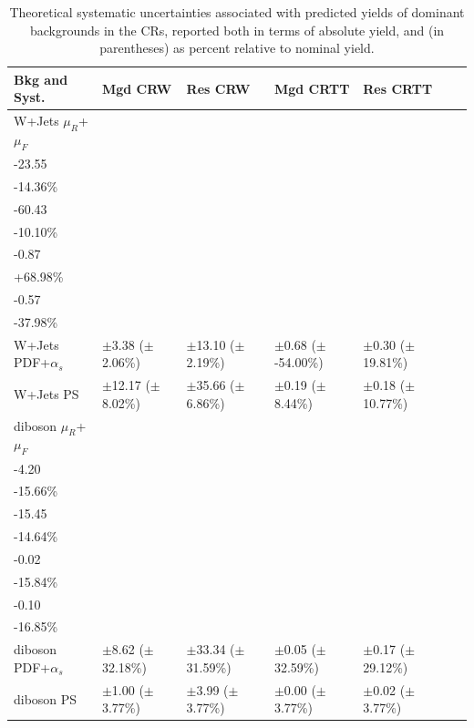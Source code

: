 \begin{table}[ht]
\footnotesize{
\caption[Theoretical systematic uncertainties associated with predicted yields of dominant backgrounds in the control regions.]{\label{tab:systs_bkg_CR} Theoretical systematic uncertainties associated with predicted yields of dominant backgrounds in the CRs, reported both in terms of absolute yield, and (in parentheses) as percent relative to nominal yield.}
\begin{tabular}{l l l l l l l }
\toprule
\textbf{Bkg and Syst.} & \textbf{Mgd CRW} & \textbf{Res CRW} & \textbf{Mgd CRTT} & \textbf{Res CRTT}\tabularnewline
\midrule
\midrule
W+Jets \(\mu_R\)+\(\mu_F\)  & \(\substack{+35.90\\-23.55}\) \big(\(\substack{+21.89\%\\-14.36\%}\)\big) & \(\substack{+42.02\\-60.43}\) \big(\(\substack{+7.03\%\\-10.10\%}\)\big) & \(\substack{+3.50\\-0.87}\) \big(\(\substack{-278.89\%\\+68.98\%}\)\big) & \(\substack{+4.83\\-0.57}\) \big(\(\substack{+319.96\%\\-37.98\%}\)\big) \tabularnewline
\midrule
W+Jets PDF+\(\alpha_s\) & \(\pm\)3.38 (\(\pm\)2.06\%) &\(\pm\)13.10 (\(\pm\)2.19\%) &\(\pm\)0.68 (\(\pm\)-54.00\%) &\(\pm\)0.30 (\(\pm\)19.81\%) \tabularnewline
\midrule
W+Jets PS & \(\pm\)12.17 (\(\pm\)8.02\%) &\(\pm\)35.66 (\(\pm\)6.86\%) &\(\pm\)0.19 (\(\pm\)8.44\%) &\(\pm\)0.18 (\(\pm\)10.77\%) \tabularnewline
\midrule
diboson \(\mu_R\)+\(\mu_F\) & \(\substack{+1.09\\-4.20}\) \big(\(\substack{+4.06\%\\-15.66\%}\)\big) & \(\substack{+18.37\\-15.45}\) \big(\(\substack{+17.40\%\\-14.64\%}\)\big) & \(\substack{+0.03\\-0.02}\) \big(\(\substack{+20.96\%\\-15.84\%}\)\big) & \(\substack{+0.13\\-0.10}\) \big(\(\substack{+22.80\%\\-16.85\%}\)\big) \tabularnewline
\midrule
diboson PDF+\(\alpha_s\) & \(\pm\)8.62 (\(\pm\)32.18\%) &\(\pm\)33.34 (\(\pm\)31.59\%) &\(\pm\)0.05 (\(\pm\)32.59\%) &\(\pm\)0.17 (\(\pm\)29.12\%) \tabularnewline
\midrule
diboson PS & \(\pm\)1.00 (\(\pm\)3.77\%) &\(\pm\)3.99 (\(\pm\)3.77\%) &\(\pm\)0.00 (\(\pm\)3.77\%) &\(\pm\)0.02 (\(\pm\)3.77\%) \tabularnewline

\end{tabular}}
\end{table}
